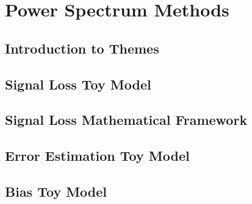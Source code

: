 \chapter{Power Spectrum Methods}
\label{c.PSmethods}


\section{Introduction to Themes}

\section{Signal Loss Toy Model}

\section{Signal Loss Mathematical Framework}

\section{Error Estimation Toy Model}

\section{Bias Toy Model}
\label{sec:BiasOverview} %





